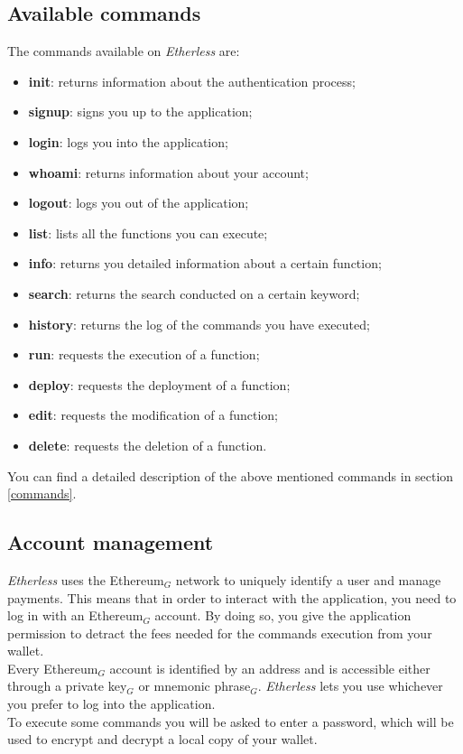 \subsection{Available commands}
\noindent The commands available on \textit{Etherless} are:
\begin{itemize}
	\item \textbf{init}: returns information about the authentication process;
	\item \textbf{signup}: signs you up to the application;
	\item \textbf{login}: logs you into the application;
	\item \textbf{whoami}: returns information about your account;
	\item \textbf{logout}: logs you out of the application;
	\item \textbf{list}: lists all the functions you can execute;
	\item \textbf{info}: returns you detailed information about a certain function;
	\item \textbf{search}: returns the search conducted on a certain keyword;
	\item \textbf{history}: returns the log of the commands you have executed;
	\item \textbf{run}: requests the execution of a function;
	\item \textbf{deploy}: requests the deployment of a function;
	\item \textbf{edit}: requests the modification of a function;
	\item \textbf{delete}: requests the deletion of a function.
\end{itemize}
You can find a detailed description of the above mentioned commands in section \ref{commands}.

\subsection{Account management}
\textit{Etherless} uses the Ethereum$_{G}$ network to uniquely identify a user and manage payments. This means that in order to interact with the application, you need to log in with an Ethereum$_{G}$ account. By doing so, you give the application permission to detract the fees needed for the commands execution from your wallet. \\
Every Ethereum$_{G}$ account is identified by an address and is accessible either through a private key$_{G}$ or mnemonic phrase$_{G}$. \textit{Etherless} lets you use whichever you prefer to log into the application. \\
To execute some commands you will be asked to enter a password, which will be used to encrypt and decrypt a local copy of your wallet.

